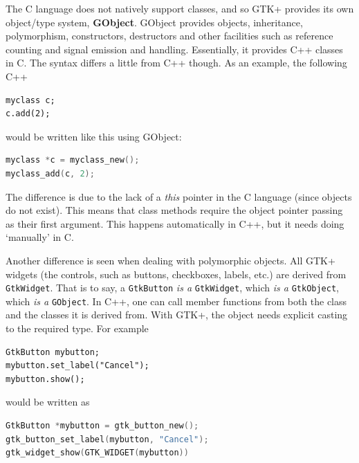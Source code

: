 \documentclass[a4paper,oneside]{article}
\newcommand{\variable}[1]{\textsl{#1}}
\newcommand{\class}[1]{\texttt{#1}}
\begin{document}
The C language does not natively support classes, and so GTK+ provides
its own object/type system, \textbf{GObject}.  GObject provides
objects, inheritance, polymorphism, constructors, destructors and
other facilities such as reference counting and signal emission and
handling.  Essentially, it provides C++ classes in C.  The syntax
differs a little from C++ though.  As an example, the following C++


\begin{lstlisting}[numbers=none, language={[GNU]C++}]
myclass c;
c.add(2);
\end{lstlisting}

\noindent would be written like this using GObject:

\begin{lstlisting}[numbers=none, language=C]
myclass *c = myclass_new();
myclass_add(c, 2);
\end{lstlisting}

\noindent The difference is due to the lack of a \variable{this}
pointer in the C language (since objects do not exist).  This means
that class methods require the object pointer passing as their first
argument.  This happens automatically in C++, but it needs doing
`manually' in C.

Another difference is seen when dealing with polymorphic objects.  All
GTK+ widgets (the controls, such as buttons, checkboxes, labels, etc.)
are derived from \class{GtkWidget}.  That is to say, a
\class{GtkButton} \emph{is a} \class{GtkWidget}, which \emph{is a}
\class{GtkObject}, which \emph{is a} \class{GObject}.  In C++, one
can call member functions from both the class and the classes it is
derived from.  With GTK+, the object needs explicit casting to the
required type.  For example

\begin{lstlisting}[numbers=none, language={[GNU]C++}]
GtkButton mybutton;
mybutton.set_label("Cancel");
mybutton.show();
\end{lstlisting}

\noindent would be written as

\begin{lstlisting}[numbers=none, language=C]
GtkButton *mybutton = gtk_button_new();
gtk_button_set_label(mybutton, "Cancel");
gtk_widget_show(GTK_WIDGET(mybutton))
\end{lstlisting}
\end{document}
